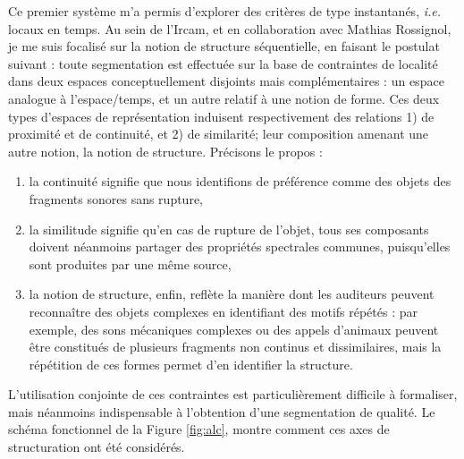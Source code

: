   Ce premier système m'a permis d'explorer des critères de type instantanés, \textit{i.e.} locaux en temps. Au sein de l'Ircam, et en collaboration avec Mathias Rossignol, je me suis focalisé sur la notion de structure séquentielle, en faisant le postulat suivant : toute segmentation est effectuée sur la base de contraintes de localité dans deux espaces conceptuellement disjoints mais complémentaires : un espace analogue à l'espace/temps, et un autre relatif à une notion de forme. Ces deux types d'espaces de représentation induisent respectivement des relations 1) de proximité et de continuité, et 2) de similarité; leur composition amenant une autre notion, la notion de structure. Précisons le propos : %

  \begin{enumerate}
    \item la continuité signifie que nous identifions de préférence comme des objets des fragments sonores sans rupture,
    \item la similitude signifie qu'en cas de rupture de l'objet, tous ses composants doivent néanmoins partager des propriétés spectrales communes, puisqu'elles sont produites par une même source,
    \item la notion de  structure, enfin, reflète la manière dont les auditeurs peuvent reconnaître des objets complexes en identifiant des motifs répétés : par exemple, des sons mécaniques complexes ou des appels d'animaux peuvent être constitués de plusieurs fragments non continus et dissimilaires, mais la répétition de ces formes permet d'en identifier la structure.
  \end{enumerate}

  L'utilisation conjointe de ces contraintes est particulièrement difficile à formaliser, mais néanmoins indispensable à l'obtention d'une segmentation de qualité. Le schéma fonctionnel de la Figure \ref{fig:alc}, montre comment ces axes de structuration ont été considérés.



